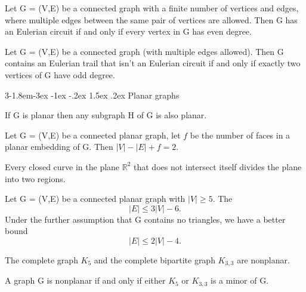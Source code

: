 \documentclass{tufte-handout}
\makeatletter
\renewcommand{\subsection}{\@startsection{subsection}%
    {3}{-1.8em}{-3ex \@plus -1ex \@minus -.2ex}%
    {1.5ex \@plus .2ex}
    {\hspace*{-5.5em}\fcolorbox{ltblue}{ltblue}{\parbox[c][1.0ex][b]{4em}{\phantom{space}}}
    \normalfont\large\itshape\color{ltblue}}}
\makeatother
\begin{document}
\begin{Theorem}
    Let G = (V,E) be a connected graph with a finite number of vertices and edges, where
    multiple edges between the same pair of vertices are allowed. Then G has an Eulerian circuit
    if and only if every vertex in G has even degree.
\end{Theorem}

\begin{Theorem}
    Let G = (V,E) be a connected graph (with multiple edges allowed). Then G contains an Eulerian trail
    that isn't an Eulerian circuit if and only if exactly two vertices of G have odd degree.
\end{Theorem}

\subsection{Planar graphs}
\begin{Proposition}
    If G is planar then any subgraph H of G is also planar.
\end{Proposition}

\begin{Theorem}
    Let G = (V,E) be a connected planar graph, let \(f\) be the number of faces in a planar embedding of G.
    Then \( \left|V\right| - \left|E\right| + f = 2 \).
\end{Theorem}

\begin{Theorem}
    Every closed curve in the plane \(\mathbb{R}^2 \) that does not intersect itself divides the plane into two regions.
\end{Theorem}

\begin{Theorem}
    Let G = (V,E) be a connected planar graph with \( \left|V\right| \geq 5 \). The
    \[\left|E\right| \leq 3\left|V\right| - 6.\]
    Under the further assumption that G contains no triangles, we have a better bound
    \[\left|E\right| \leq 2\left|V\right| - 4.\]
\end{Theorem}

\begin{Corollary}
    The complete graph \( K_5 \) and the complete bipartite graph \( K_{3,3} \) are nonplanar.
\end{Corollary}

\begin{Theorem}
    A graph G is nonplanar if and only if either \(K_5\) or \(K_{3,3}\) is a minor of G.
\end{Theorem}
\end{document}
